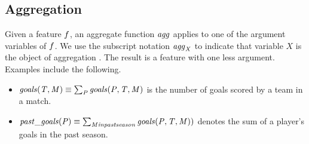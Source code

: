 \documentclass[conference]{IEEEtran}
\newcommand{\team}{T}
\newcommand{\player}{P}
\newcommand{\match}{M}
\newcommand{\plusminus}{\mbox{+/-}}
\newcommand{\aggregate}{\it{agg}}
\begin{document}
\subsection{Aggregation} Given a feature $f$, an aggregate function $\aggregate$ applies to one of the argument variables of $f$. We use the subscript notation $\aggregate_{X}$ to indicate that variable $X$ is the object of aggregation \cite{Popescul2007}. The result is a feature with one less argument. Examples include the following.

\begin{itemize}
\item $\it{goals}(\team,\match) \equiv \sum_{\player} \it{goals}(\player,\team,\match)$ is the number of goals scored by a team in a match.
\item $\it{past}\_\it{goals}(\player) \equiv \sum_{\match \mbox{ in past season}} \it{goals}(\player,\team,\match))$ denotes the sum of a player's goals in the past season.
\end{itemize}


%
\end{document}
